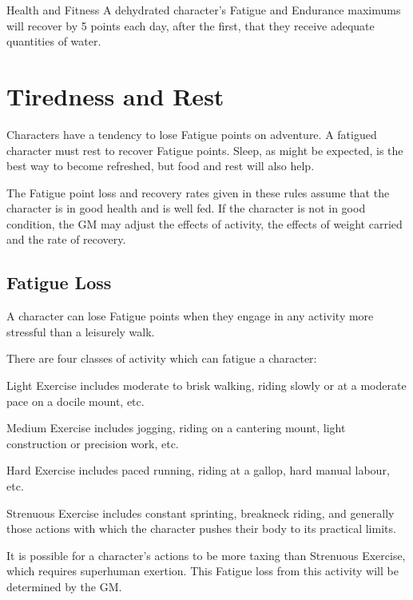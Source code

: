 \begin{Chapter}{Health and Fitness}
A dehydrated character’s Fatigue and Endurance maximums will recover
by 5 points each day, after the first, that they receive adequate
quantities of water.


\section{Tiredness and Rest}
\label{health:tireness}\label{health:rest}
Characters have a tendency to lose Fatigue points on adventure.  A
fatigued character must rest to recover Fatigue points.  Sleep, as
might be expected, is the best way to become refreshed, but food and
rest will also help.

The Fatigue point loss and recovery rates given in these rules assume
that the character is in good health and is well fed.  If the
character is not in good condition, the GM may adjust the effects of
activity, the effects of weight carried and the rate of recovery.

\subsection{Fatigue Loss}

A character can lose Fatigue points when they engage in any activity
more stressful than a leisurely walk.

There are four classes of activity which can fatigue a character:

\begin{Enumerate}

\item Light Exercise includes moderate to brisk walking, riding slowly
  or at a moderate pace on a docile mount, etc.

\item Medium Exercise includes jogging, riding on a cantering mount,
  light construction or precision work, etc.

\item Hard Exercise includes paced running, riding at a gallop, hard
  manual labour, etc.

\item Strenuous Exercise includes constant sprinting, breakneck
  riding, and generally those actions with which the character pushes
  their body to its practical limits.

\end{Enumerate}

It is possible for a character’s actions to be more taxing than
Strenuous Exercise, which requires superhuman exertion.  This Fatigue
loss from this activity will be determined by the GM.


\end{Chapter}
